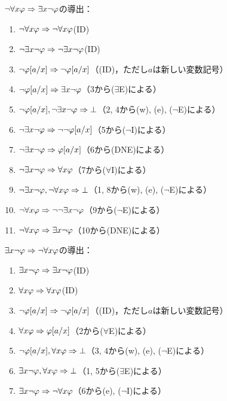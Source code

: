 \(\lnot \forall x \varphi \Rightarrow \exists x \lnot \varphi\)の導出：
\begin{enumerate}
	\item \(\lnot \forall x \varphi \Rightarrow \lnot \forall x \varphi\)\quad (ID)
	\item \(\lnot \exists x \lnot \varphi \Rightarrow \lnot \exists x \lnot \varphi\)\quad (ID)
	\item \(\lnot \subst{\varphi}{a/x} \sequent \lnot \subst{\varphi}{a/x}\)\quad （(ID)，ただし\(a\)は新しい変数記号）
	\item \(\lnot \subst{\varphi}{a/x} \sequent \exists x \lnot \varphi\)\quad （3から(\(\exists\)E)による）
	\item \(\lnot \subst{\varphi}{a/x}, \lnot \exists x \lnot \varphi \sequent \bot\)\quad （2, 4から(w), (e), (\(\lnot\)E)による）
	\item \(\lnot \exists x \lnot \varphi \sequent \lnot \lnot \subst{\varphi}{a/x}\)\quad （5から(\(\lnot\)I)による）
	\item \(\lnot \exists x \lnot \varphi \sequent \subst{\varphi}{a/x}\)\quad （6から(DNE)による）
	\item \(\lnot \exists x \lnot \varphi \Rightarrow \forall x \varphi\)\quad （7から(\(\forall\)I)による）
	\item \(\lnot \exists x \lnot \varphi, \lnot \forall x \varphi \Rightarrow \bot\)\quad （1, 8から(w), (e), (\(\lnot\)E)による）
	\item \(\lnot \forall x \varphi \Rightarrow \lnot \lnot \exists x \lnot \varphi\)\quad （9から(\(\lnot\)E)による）
	\item \(\lnot \forall x \varphi \Rightarrow \exists x \lnot \varphi\)\quad （10から(DNE)による）
\end{enumerate}

\(\exists x \lnot \varphi \Rightarrow \lnot \forall x \varphi\)の導出：
\begin{enumerate}
	\item \(\exists x \lnot \varphi \Rightarrow \exists x \lnot \varphi\)\quad (ID)
	\item \(\forall x \varphi \Rightarrow \forall x \varphi\)\quad (ID)
	\item \(\lnot \subst{\varphi}{a/x} \sequent \lnot \subst{\varphi}{a/x}\)\quad （(ID)，ただし\(a\)は新しい変数記号）
	\item \(\forall x \varphi \sequent \subst{\varphi}{a/x}\)\quad （2から(\(\forall\)E)による）
	\item \(\lnot \subst{\varphi}{a/x}, \forall x \varphi \sequent \bot\)\quad （3, 4から(w), (e), (\(\lnot\)E)による）
	\item \(\exists x \lnot \varphi, \forall x \varphi \Rightarrow \bot\)\quad （1, 5から(\(\exists\)E)による）
	\item \(\exists x \lnot \varphi \Rightarrow \lnot \forall x \varphi\)\quad （6から(e), (\(\lnot\)I)による）
\end{enumerate}

